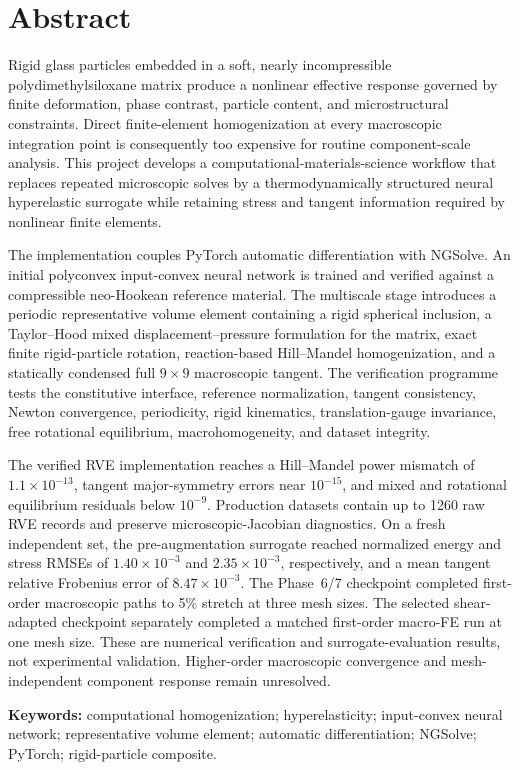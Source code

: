 \chapter*{Abstract}

Rigid glass particles embedded in a soft, nearly incompressible
polydimethylsiloxane matrix produce a nonlinear effective response governed by
finite deformation, phase contrast, particle content, and microstructural
constraints. Direct finite-element homogenization at every macroscopic
integration point is consequently too expensive for routine component-scale
analysis. This project develops a computational-materials-science workflow
that replaces repeated microscopic solves by a thermodynamically structured
neural hyperelastic surrogate while retaining stress and tangent information
required by nonlinear finite elements.

The implementation couples PyTorch automatic differentiation with NGSolve.
An initial polyconvex input-convex neural network is trained and verified
against a compressible neo-Hookean reference material. The multiscale stage
introduces a periodic representative volume element containing a rigid
spherical inclusion, a Taylor--Hood mixed displacement--pressure formulation
for the matrix, exact finite rigid-particle rotation, reaction-based
Hill--Mandel homogenization, and a statically condensed full \(9\times9\)
macroscopic tangent. The verification programme tests the constitutive
interface, reference normalization, tangent consistency, Newton convergence,
periodicity, rigid kinematics, translation-gauge invariance, free rotational
equilibrium, macrohomogeneity, and dataset integrity.

The verified RVE implementation reaches a Hill--Mandel power mismatch of
\(1.1\times10^{-13}\), tangent major-symmetry errors near \(10^{-15}\), and
mixed and rotational equilibrium residuals below \(10^{-9}\). Production
datasets contain up to 1260 raw RVE records and preserve microscopic-Jacobian
diagnostics. On a fresh independent set, the pre-augmentation surrogate
reached normalized energy and stress RMSEs of \(1.40\times10^{-3}\) and
\(2.35\times10^{-3}\), respectively, and a mean tangent relative Frobenius
error of \(8.47\times10^{-3}\). The Phase~6/7 checkpoint completed
first-order macroscopic paths to 5\% stretch at three mesh sizes.
The selected shear-adapted checkpoint separately completed a matched first-order
macro-FE run at one mesh size.
These are numerical verification and surrogate-evaluation results, not
experimental validation. Higher-order macroscopic convergence and
mesh-independent component response remain unresolved.

\vspace{3mm}
\noindent\textbf{Keywords:} computational homogenization; hyperelasticity;
input-convex neural network; representative volume element; automatic
differentiation; NGSolve; PyTorch; rigid-particle composite.
